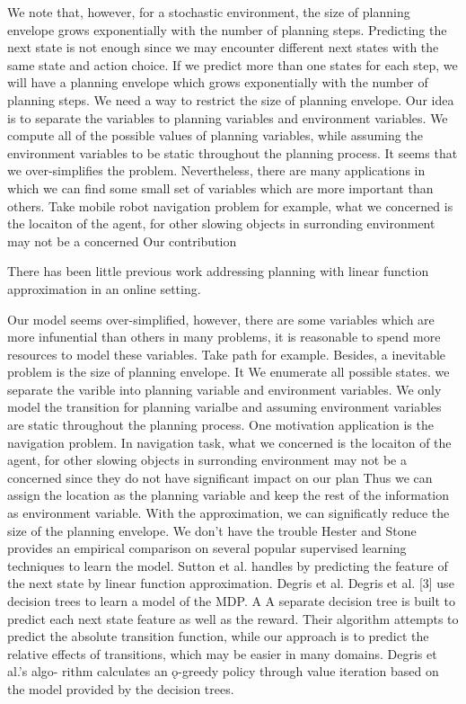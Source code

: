 \documentclass{article} %
\begin{document}
We note that, however, for a stochastic environment, the size of planning envelope grows exponentially with the number of planning
steps. Predicting the next state is not enough since we may encounter different next states with the same state and action choice.
If we predict more than one states for each step, we will have a planning envelope which grows exponentially with the number of planning
steps. We need a way to restrict the size of planning envelope. Our idea is to separate the variables to planning variables 
and environment variables. We compute all of the possible values of planning variables, while assuming 
the environment variables to be static throughout the planning process.  
It seems that we over-simplifies the problem. Nevertheless, there are many applications
in which we can find some small set of variables which are more important than others. Take 
mobile robot navigation problem for example, 
what we concerned is the locaiton of the agent, 
for other slowing objects in surronding environment may not be a concerned 
Our contribution


There has been little previous work addressing planning
with linear function approximation in an online setting.

Our model seems over-simplified, however, there are some variables which are more 
infunential than others in many problems, it is reasonable to spend more resources
to model these variables. Take path for example.
Besides, a inevitable problem is the size of planning envelope. It 
We enumerate all possible states.
we separate the varible into planning variable and environment variables.
We only model the transition for planning varialbe and assuming environment variables are
static throughout the planning process.
One motivation application is the navigation problem. In navigation task,
what we concerned is the locaiton of the agent, 
for other slowing objects in surronding environment may not be a concerned 
since they do not have significant impact on our plan
Thus we can assign the location
as the planning variable and keep the rest of the information as environment variable.
With the approximation, we can significatly reduce the size of the planning envelope.
We don't have the trouble 
Hester and Stone provides an empirical comparison on several popular 
supervised learning techniques to learn the model.
Sutton et al. handles by predicting the feature of the next state by linear function approximation.
Degris et al. 
Degris et al. [3] use decision trees to learn a model of
the MDP. A
A separate decision tree is built to predict each
next state feature as well as the reward. Their algorithm
attempts to predict the absolute transition function, while
our approach is to predict the relative effects of transitions,
which may be easier in many domains. Degris et al.’s algo-
rithm calculates an ǫ-greedy policy through value iteration
based on the model provided by the decision trees.
\end{document}
